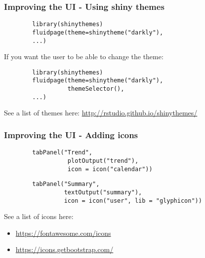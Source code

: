 \documentclass{beamer}
\begin{document}
	\begin{frame}[fragile]
		\frametitle{Improving the UI - Using shiny themes}
		
		\begin{exampleblock}{}
		\begin{BVerbatim}
		library(shinythemes)
		fluidpage(theme=shinytheme("darkly"),
		...)
		\end{BVerbatim}
		\end{exampleblock}{}

		\vspace{2em}

		If you want the user to be able to change the theme:
		
		\begin{exampleblock}{}
		\begin{BVerbatim}
		library(shinythemes)
		fluidpage(theme=shinytheme("darkly"),
		          themeSelector(),
		...)
		\end{BVerbatim}
		\end{exampleblock}{}

		\vspace{2em}

		See a list of themes here: \href{http://rstudio.github.io/shinythemes/}{http://rstudio.github.io/shinythemes/}
 	
	\end{frame}

	\begin{frame}[fragile]
		\frametitle{Improving the UI - Adding icons}
		
		\begin{exampleblock}{}
		\begin{BVerbatim}
		tabPanel("Trend",
		          plotOutput("trend"),
		          icon = icon("calendar"))
		\end{BVerbatim}
		\end{exampleblock}{}

		\begin{exampleblock}{}
		\begin{BVerbatim}
		tabPanel("Summary",
		         textOutput("summary"),
		         icon = icon("user", lib = "glyphicon"))
		\end{BVerbatim}
		\end{exampleblock}{}

		\vspace{2em}

		See a list of icons here:
		\begin{itemize}
			\item \href{https://fontawesome.com/icons}{https://fontawesome.com/icons}
			\item \href{https://icons.getbootstrap.com/}{https://icons.getbootstrap.com/}
		\end{itemize}
 	
	\end{frame}
\end{document}
